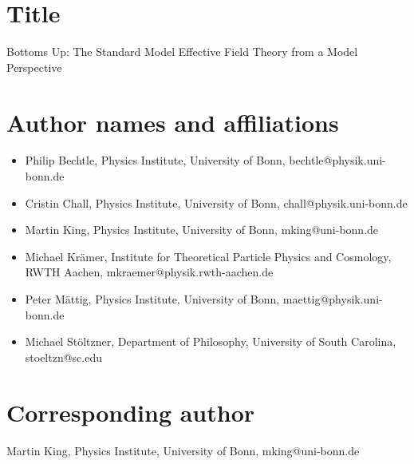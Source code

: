 \documentclass{article}
\begin{document}
\section*{Title}
Bottoms Up: The Standard Model Effective Field Theory from a Model Perspective

\section*{Author names and affiliations}
\begin{itemize}
	\item Philip Bechtle, Physics Institute, University of Bonn, bechtle@physik.uni-bonn.de
	\item Cristin Chall, Physics Institute, University of Bonn, chall@physik.uni-bonn.de
	\item Martin King, Physics Institute, University of Bonn, mking@uni-bonn.de
	\item Michael Kr\"{a}mer, Institute for Theoretical Particle Physics and Cosmology, RWTH Aachen, mkraemer@physik.rwth-aachen.de
	\item Peter M\"{a}ttig, Physics Institute, University of Bonn, maettig@physik.uni-bonn.de
	\item Michael St\"{o}ltzner, Department of Philosophy, University of South Carolina, stoeltzn@sc.edu
\end{itemize}

\section*{Corresponding author}
Martin King, Physics Institute, University of Bonn, mking@uni-bonn.de
\end{document}
